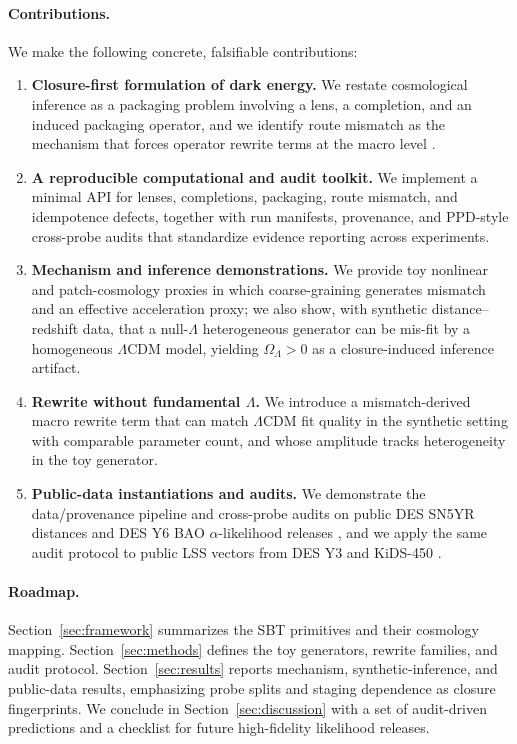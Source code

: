 \documentclass[11pt]{article}
\theoremstyle{definition}
\theoremstyle{plain}
\theoremstyle{remark}
\begin{document}
\paragraph{Contributions.}
We make the following concrete, falsifiable contributions:
\begin{enumerate}
  \item \textbf{Closure-first formulation of dark energy.} We restate cosmological inference as a packaging problem involving a lens, a completion, and an induced packaging operator, and we identify route mismatch as the mechanism that forces operator rewrite terms at the macro level \cite{Tsiokos2026SixBirds,Tsiokos2026WakeStone}.
  \item \textbf{A reproducible computational and audit toolkit.} We implement a minimal API for lenses, completions, packaging, route mismatch, and idempotence defects, together with run manifests, provenance, and PPD-style cross-probe audits that standardize evidence reporting across experiments.
  \item \textbf{Mechanism and inference demonstrations.} We provide toy nonlinear and patch-cosmology proxies in which coarse-graining generates mismatch and an effective acceleration proxy; we also show, with synthetic distance--redshift data, that a null-$\Lambda$ heterogeneous generator can be mis-fit by a homogeneous $\Lambda$CDM model, yielding $\Omega_\Lambda>0$ as a closure-induced inference artifact.
  \item \textbf{Rewrite without fundamental $\Lambda$.} We introduce a mismatch-derived macro rewrite term that can match $\Lambda$CDM fit quality in the synthetic setting with comparable parameter count, and whose amplitude tracks heterogeneity in the toy generator.
  \item \textbf{Public-data instantiations and audits.} We demonstrate the data/provenance pipeline and cross-probe audits on public DES SN5YR distances and DES Y6 BAO $\alpha$-likelihood releases \cite{DES2024SN5YRCosmology,DES2024SN5YRData,DES2024Y6BAO}, and we apply the same audit protocol to public LSS vectors from DES Y3 and KiDS-450 \cite{DES2022Y3_3x2pt,vanUitert2018KiDSGAMA,KiDSDataProducts}.
\end{enumerate}

\paragraph{Roadmap.}
Section~\ref{sec:framework} summarizes the SBT primitives and their cosmology mapping.
Section~\ref{sec:methods} defines the toy generators, rewrite families, and audit protocol.
Section~\ref{sec:results} reports mechanism, synthetic-inference, and public-data results, emphasizing probe splits and staging dependence as closure fingerprints.
We conclude in Section~\ref{sec:discussion} with a set of audit-driven predictions and a checklist for future high-fidelity likelihood releases.
\end{document}
